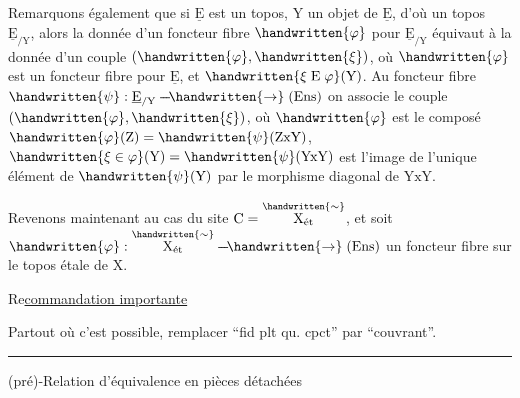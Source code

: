 \begin{lrbox}{\coteSixTypescript}
\begin{minipage}[t]{.96\linewidth}
 Remarquons également que si $\underline{\mathrm E}$ est un topos, $\mathrm Y$ un objet de $\underline{\mathrm E}$, d'où un topos $\underline{\mathrm E}_{/\mathrm Y}$, alors la donnée d'un foncteur fibre $\handwritten{\varphi}$ pour $\underline{\mathrm E}_{/\mathrm Y}$ équivaut à la donnée d'un couple $(\handwritten{\varphi},\handwritten{\xi})$, où $\handwritten{\varphi}$ est un foncteur fibre pour $\underline{\mathrm E}$, et $\handwritten{\xi\mathrel{\mathrm E}\varphi}(\mathrm Y)$. Au foncteur fibre $\handwritten{\psi}:\underline{\mathrm E}_{/\mathrm Y}\mathrel{\mbox{-}\mkern-2mu\mbox{-}\mkern-2mu\mbox{-}\mkern-3mu\handwritten{\to}}(\mathrm{Ens})$ on associe le couple $(\handwritten{\varphi},\handwritten{\xi})$, où $\handwritten{\varphi}$ est le composé $\handwritten{\varphi}(\mathrm Z)=\handwritten{\psi}(\mathrm Z\mathrm{x}\mathrm Y)$, $\handwritten{\xi\in\varphi}(\mathrm Y)=\handwritten{\psi}(\mathrm Y\mathrm{x}\mathrm Y)$ est l'image de l'unique élément de $\handwritten{\psi}(\mathrm Y)$ par le morphisme diagonal de $\mathrm Y\mathrm{x}\mathrm Y$.

 Revenons maintenant au cas du site $\mathrm C=\overset{\handwritten{\sim}}{\mathrm X_{\text{ét}}}$, et soit $\handwritten{\varphi}:\overset{\handwritten{\sim}}{\mathrm X_{\text{ét}}}\mathrel{\mbox{-}\mkern-2mu\mbox{-}\mkern-2mu\mbox{-}\mkern-3mu\handwritten{\to}}(\mathrm{Ens})$ un foncteur fibre sur le topos étale de $\mathrm X$.
\end{minipage}
\end{lrbox}
\noindent{}


\clearpage
{}

Re\uline{commandation importante}

Partout où c'est possible, remplacer ``fid plt qu. cpct'' par ``couvrant''.

\noindent\rule{\linewidth}{.3pt}

(pré)-Relation d'équivalence en pièces détachées 


